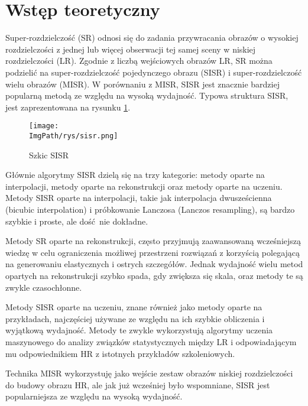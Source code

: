 \documentclass[a4paper,12pt,twoside,openany]{report}
\newcommand{\ImgPath}{.}
\begin{document}

\section{Wstęp teoretyczny}
	Super-rozdzielczość (SR) odnosi się do zadania przywracania obrazów o wysokiej rozdzielczości z jednej lub więcej obserwacji tej samej sceny w niskiej rozdzielczości (LR). Zgodnie z liczbą wejściowych obrazów LR, SR można podzielić na super-rozdzielczość pojedynczego obrazu (SISR) i super-rozdzielczość wielu obrazów (MISR). W porównaniu z MISR, SISR jest znacznie bardziej popularną metodą ze względu na wysoką wydajność. Typowa struktura SISR, jest zaprezentowana na rysunku \ref{szkicSisr}.
	\begin{figure}[!htbp]
		\begin{center}
			\centering
			\texttt{[image: \\ImgPath/rys/sisr.png]}
		\end{center}
		\caption{Szkic SISR}
		\label{szkicSisr}
	\end{figure}
  	\newpage
  	Głównie algorytmy SISR dzielą się na trzy kategorie: metody oparte na interpolacji, metody oparte na rekonstrukcji oraz metody oparte na uczeniu. Metody SISR oparte na interpolacji, takie jak interpolacja dwusześcienna (bicubic  interpolation) i próbkowanie Lanczosa (Lanczos resampling), są bardzo szybkie i proste, ale dość nie dokładne.
  	  
  	Metody SR oparte na rekonstrukcji,  często przyjmują zaawansowaną wcześniejszą wiedzę w celu ograniczenia możliwej przestrzeni rozwiązań z korzyścią polegającą na generowaniu elastycznych i ostrych szczegółów. Jednak wydajność wielu metod opartych na rekonstrukcji szybko spada, gdy zwiększa się skala, oraz metody te są zwykle czasochłonne.
  
  	Metody SISR oparte na uczeniu, znane również jako metody oparte na przykładach, najczęściej używane ze względu na ich szybkie obliczenia i wyjątkową wydajność. Metody te zwykle wykorzystują algorytmy uczenia maszynowego do analizy związków statystycznych między LR i odpowiadającym mu odpowiednikiem HR z istotnych przykładów szkoleniowych.
  
  	Technika MISR wykorzystuję jako wejście zestaw obrazów niskiej rozdzielczości do budowy obrazu HR, ale jak już wcześniej było wspomniane, SISR jest popularniejsza ze względu na wysoką wydajność.

  
\end{document}

